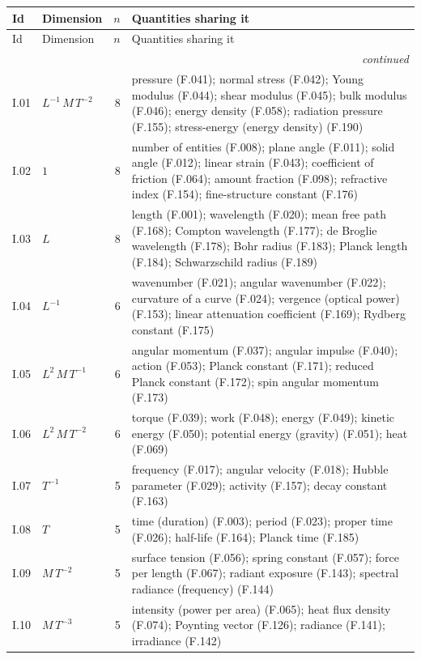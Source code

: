 {\scriptsize\setlength{\tabcolsep}{3pt}
\begin{longtable}{@{}llr>{\raggedright\arraybackslash}p{11.6cm}@{}}
\toprule
Id & Dimension & $n$ & Quantities sharing it \\
\midrule\endfirsthead
\toprule
Id & Dimension & $n$ & Quantities sharing it \\
\midrule\endhead
\midrule\multicolumn{4}{r}{\emph{continued}}\\\endfoot
\bottomrule\endlastfoot
I.01 & $L^{-1}\,M\,T^{-2}$ & 8 & pressure (F.041); normal stress (F.042); Young modulus (F.044); shear modulus (F.045); bulk modulus (F.046); energy density (F.058); radiation pressure (F.155); stress-energy (energy density) (F.190) \\
I.02 & $1$ & 8 & number of entities (F.008); plane angle (F.011); solid angle (F.012); linear strain (F.043); coefficient of friction (F.064); amount fraction (F.098); refractive index (F.154); fine-structure constant (F.176) \\
I.03 & $L$ & 8 & length (F.001); wavelength (F.020); mean free path (F.168); Compton wavelength (F.177); de Broglie wavelength (F.178); Bohr radius (F.183); Planck length (F.184); Schwarzschild radius (F.189) \\
I.04 & $L^{-1}$ & 6 & wavenumber (F.021); angular wavenumber (F.022); curvature of a curve (F.024); vergence (optical power) (F.153); linear attenuation coefficient (F.169); Rydberg constant (F.175) \\
I.05 & $L^{2}\,M\,T^{-1}$ & 6 & angular momentum (F.037); angular impulse (F.040); action (F.053); Planck constant (F.171); reduced Planck constant (F.172); spin angular momentum (F.173) \\
I.06 & $L^{2}\,M\,T^{-2}$ & 6 & torque (F.039); work (F.048); energy (F.049); kinetic energy (F.050); potential energy (gravity) (F.051); heat (F.069) \\
I.07 & $T^{-1}$ & 5 & frequency (F.017); angular velocity (F.018); Hubble parameter (F.029); activity (F.157); decay constant (F.163) \\
I.08 & $T$ & 5 & time (duration) (F.003); period (F.023); proper time (F.026); half-life (F.164); Planck time (F.185) \\
I.09 & $M\,T^{-2}$ & 5 & surface tension (F.056); spring constant (F.057); force per length (F.067); radiant exposure (F.143); spectral radiance (frequency) (F.144) \\
I.10 & $M\,T^{-3}$ & 5 & intensity (power per area) (F.065); heat flux density (F.074); Poynting vector (F.126); radiance (F.141); irradiance (F.142) \\

\end{longtable}}
